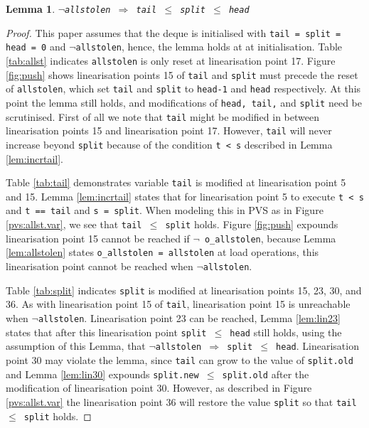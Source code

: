 \documentclass{sig-alternate-br}
\newtheorem{lemma}{Lemma}
\begin{document}
\begin{lemma}
	\texttt{$\neg$allstolen $\Rightarrow$ tail $\leq$ split $\leq$ head}
	\label{lem:allst.var}
\end{lemma}
\begin{proof}
	This paper assumes that the deque is initialised with \texttt{tail = split = head = 0} and \texttt{$\neg$allstolen}, hence, the lemma holds at at initialisation.
	Table \ref{tab:allst} indicates \texttt{allstolen} is only reset at linearisation point 17.
	Figure \ref{fig:push} shows linearisation points 15 of \texttt{tail} and \texttt{split} must precede the reset of \texttt{allstolen}, which set \texttt{tail} and \texttt{split} to \texttt{head-1} and \texttt{head} respectively.
	At this point the lemma still holds, and modifications of \texttt{head, tail,} and \texttt{split} need be scrutinised.
	First of all we note that \texttt{tail} might be modified in between linearisation points 15 and linearisation point 17.
	However, \texttt{tail} will never increase beyond \texttt{split} because of the condition \texttt{t < s} described in Lemma \ref{lem:incrtail}.
	
	Table \ref{tab:tail} demonstrates variable \texttt{tail} is modified at linearisation point 5 and 15.
	Lemma \ref{lem:incrtail} states that for linearisation point 5 to execute \texttt{t < s} and \texttt{t == tail} and \texttt{s = split}.
	When modeling this in PVS as in Figure \ref{pvs:allst.var}, we see that \texttt{tail $\leq$ split} holds.
	Figure \ref{fig:push} expounds linearisation point 15 cannot be reached if \texttt{$\neg$ o\_allstolen}, because Lemma \ref{lem:allstolen} states \texttt{o\_allstolen = allstolen} at load operations, this linearisation point cannot be reached when \texttt{$\neg$allstolen}.
	
	Table \ref{tab:split} indicates \texttt{split} is modified at linearisation points 15, 23, 30, and 36.
	As with linearisation point 15 of \texttt{tail}, linearisation point 15 is unreachable when \texttt{$\neg$allstolen}.
	Linearisation point 23 can be reached, Lemma \ref{lem:lin23} states that after this linearisation point \texttt{split $\leq$ head} still holds, using the assumption of this Lemma, that \texttt{$\neg$allstolen $\Rightarrow$ split $\leq$ head}.
	Linearisation point 30 may violate the lemma, since \texttt{tail} can grow to the value of \texttt{split.old} and Lemma \ref{lem:lin30} expounds \texttt{split.new $\leq$ split.old} after the modification of linearisation point 30.
	However, as described in Figure \ref{pvs:allst.var} the linearisation point 36 will restore the value \texttt{split} so that \texttt{tail $\leq$ split} holds.
	

\end{proof}
\end{document}
